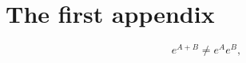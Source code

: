 \chapter{The first appendix}
\label{app:first} 

\lipsum[1-2]
\begin{equation}
		e^{A+B} \neq e^{A} e^{B},
\end{equation}
\lipsum[3]